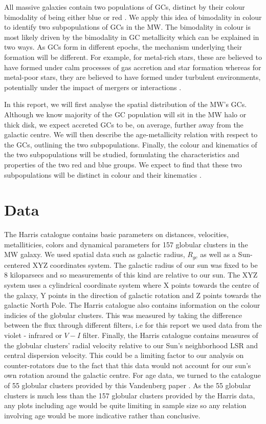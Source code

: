 \documentclass[fleqn,usenatbib]{mnras}
\begin{document}
All massive galaxies contain two populations of GCs, distinct by their colour bimodality of being 
either blue or red \citep{Renaud_2016}. We apply this idea of bimodality in colour to identify two 
subpopulations of GCs in the MW. The bimodality in colour is most likely driven by the bimodality 
in GC metallicity which can be explained in two ways. As GCs form in different epochs, the mechanism 
underlying their formation will be different. For example, for metal-rich stars, these are believed 
to have formed under calm processes of gas accretion and star formation whereas for metal-poor stars, 
they are believed to have formed under turbulent environments, potentially under the impact of mergers 
or interactions \citep{collazos2023galacticarchaeologytracingmilky}.

In this report, we will first analyse the spatial distribution of the MW's GCs. Although we know majority 
of the GC population will sit in the MW halo or thick disk, we expect accreted GCs to be, on average, further 
away from the galactic centre. We will then describe the age-metallicity relation with respect to the GCs, 
outlining the two subpopulations. Finally, the colour and kinematics of the two subpopulations will be studied,
formulating the characteristics and properties of the two red and blue groups. We expect to find that these 
two subpopulations will be distinct in colour and their kinematics \cite{Blom_2014}.

\section{Data}
The Harris catalogue \citep{harris2010newcatalogglobularclusters} contains basic parameters on distances, 
velocities, metalliticies, colors and dynamical parameters for 157 globular clusters in the MW galaxy.
We used spatial data such as galactic radius, $R_{gc}$ as well as a Sun-centered XYZ coordinates system.
The galactic radius of our sun was fixed to be 8 kiloparsecs and so measurements of this kind are relative 
to our sun. The XYZ system uses a cylindrical coordinate system where X points towards the centre of the 
galaxy, Y points in the direction of galactic rotation and Z points towards the galactic North Pole. The 
Harris catalogue also contains information on the colour indicies of the globular clusters. This was 
measured by taking the difference between the flux through different filters, i.e for this report we used 
data from the violet - infrared or $V-I$ filter. Finally, the Harris catalogue contains measures of the 
globular clusters' radial velocity relative to our Sun's neighborhood LSR and central dispersion velocity.
This could be a limiting factor to our analysis on counter-rotators due to the fact that this data would 
not account for our sun's own rotation around the galactic centre. For age data, we turned to the catalogue 
of 55 globular clusters provided by this Vandenberg paper \citep{VandenBerg_2013}. As the 55 globular clusters 
is much less than the 157 globular clusters provided by the Harris data, any plots including age would be 
quite limiting in sample size so any relation involving age would be more indicative rather than conclusive.
\end{document}
